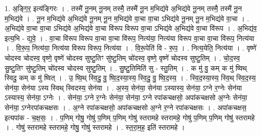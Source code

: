 \documentclass[17pt]{extarticle}
\begin{document}
1. अ॒ङ्‍गि॒र॒ इत्य॑ङ्‍गिरः । . तस्मै॑ नू॒नम् नू॒नम् तस्मै॒ तस्मै॑ नू॒न म॒भिद्य॑वे अ॒भिद्य॑वे नू॒नम् तस्मै॒ तस्मै॑ नू॒न म॒भिद्य॑वे । . नू॒न म॒भिद्य॑वे अ॒भिद्य॑वे नू॒नम् नू॒न म॒भिद्य॑वे वा॒चा वा॒चा ऽभिद्य॑वे नू॒नम् नू॒न म॒भिद्य॑वे वा॒चा । . अ॒भिद्य॑वे वा॒चा वा॒चा ऽभिद्य॑वे अ॒भिद्य॑वे वा॒चा वि॑रूप विरूप वा॒चा ऽभिद्य॑वे अ॒भिद्य॑वे वा॒चा वि॑रूप । . अ॒भिद्य॑व॒ इत्य॒भि - द्य॒वे॒ । . वा॒चा वि॑रूप विरूप वा॒चा वा॒चा वि॑रूप॒ नित्य॑या॒ नित्य॑या विरूप वा॒चा वा॒चा वि॑रूप॒ नित्य॑या । . वि॒रू॒प॒ नित्य॑या॒ नित्य॑या विरूप विरूप॒ नित्य॑या । . वि॒रू॒पेति॑ वि - रू॒प॒ । . नित्य॒येति॒ नित्य॑या । . वृष्णे॑ चोदस्व चोदस्व॒ वृष्णे॒ वृष्णे॑ चोदस्व सुष्टु॒तिꣳ सु॑ष्टु॒तिम् चो॑दस्व॒ वृष्णे॒ वृष्णे॑ चोदस्व सुष्टु॒तिम् । . चो॒द॒स्व॒ सु॒ष्टु॒तिꣳ सु॑ष्टु॒तिम् चो॑दस्व चोदस्व सुष्टु॒तिम् । . सु॒ष्टु॒तिमिति॑ सु - स्तु॒तिम् । . क मु॑ वु॒ कम् क मु॑ ष्विथ् स्विदु॒ कम् क मु॑ ष्वित् । . उ॒ ष्वि॒थ् स्वि॒दु॒ वु॒ ष्वि॒द॒स्या॒स्य॒ स्वि॒दु॒ वु॒ ष्वि॒द॒स्य॒ । . स्वि॒द॒स्या॒स्य॒ स्वि॒थ् स्वि॒द॒स्य॒ सेन॑या॒ सेन॑या ऽस्य स्विथ् स्विदस्य॒ सेन॑या । . अ॒स्य॒ सेन॑या॒ सेन॑या ऽस्यास्य॒ सेन॑या॒ ऽग्ने र॒ग्नेः सेन॑या ऽस्यास्य॒ सेन॑या॒ ऽग्नेः । . सेन॑या॒ ऽग्ने र॒ग्नेः सेन॑या॒ सेन॑या॒ ऽग्ने रपा॑कचक्षसो॒ अपा॑कचक्षसो अ॒ग्नेः सेन॑या॒ सेन॑या॒ ऽग्नेरपा॑कचक्षसः । . अ॒ग्ने रपा॑कचक्षसो॒ अपा॑कचक्षसो अ॒ग्ने र॒ग्ने रपा॑कचक्षसः । . अपा॑कचक्षस॒ इत्यपा॑क - च॒क्ष॒सः॒ । . प॒णिम् गोषु॒ गोषु॑ प॒णिम् प॒णिम् गोषु॑ स्तरामहे स्तरामहे॒ गोषु॑ प॒णिम् प॒णिम् गोषु॑ स्तरामहे । . गोषु॑ स्तरामहे स्तरामहे॒ गोषु॒ गोषु॑ स्तरामहे । . स्त॒रा॒म॒ह॒ इति॑ स्तरामहे । \newline
\end{document}
